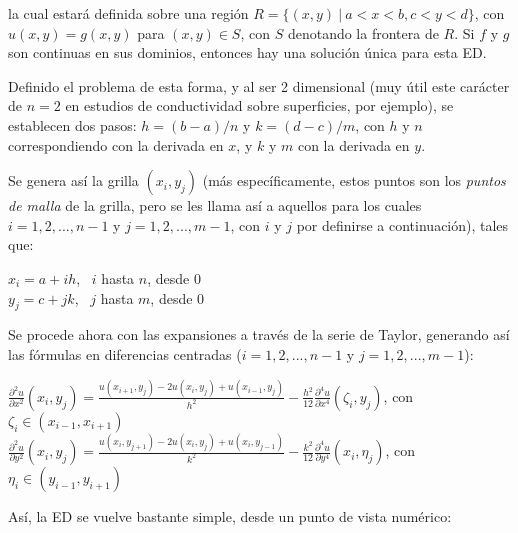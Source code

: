 \documentclass[letter]{article}
\begin{document}
la cual estará definida sobre una región $\displaystyle R=\{(x,y) \ | \ a<x<b, c<y<d\}$, con $\displaystyle u(x,y)=g(x,y)$ para $\displaystyle (x,y)\in S$, con $\displaystyle S$ denotando la frontera de $\displaystyle R$. Si $\displaystyle f$ y $\displaystyle g$ son continuas en sus dominios, entonces hay una solución única para esta ED.

Definido el problema de esta forma, y al ser 2 dimensional (muy útil este carácter de $\displaystyle n=2$ en estudios de conductividad sobre superficies, por ejemplo), se establecen dos pasos: $\displaystyle h=(b-a)/n$ y $\displaystyle k=(d-c)/m$, con $\displaystyle h$ y $\displaystyle n$ correspondiendo con la derivada en $\displaystyle x$, y $\displaystyle k$ y $\displaystyle m$ con la derivada en $\displaystyle y$.

Se genera así la grilla $\displaystyle (x_{i},y_{j})$ (más específicamente, estos puntos son los \textit{puntos de malla} de la grilla, pero se les llama así a aquellos para los cuales $\displaystyle i=1,2,...,n-1$ y $\displaystyle j=1,2,...,m-1$, con $\displaystyle i$ y $\displaystyle j$ por definirse a continuación), tales que:

\begin{center}
$\displaystyle x_{i}=a+ih$, \ $\displaystyle i$ hasta $\displaystyle n$, desde 0\\
$\displaystyle y_{j}=c+jk$, \ $\displaystyle j$ hasta $\displaystyle m$, desde 0
\end{center}

Se procede ahora con las expansiones a través de la serie de Taylor, generando así las fórmulas en diferencias centradas ($\displaystyle i=1,2,...,n-1$ y $\displaystyle j=1,2,...,m-1$):

\begin{center}
$\displaystyle \frac{\partial^{2}u}{\partial x^{2}}(x_{i},y_{j})=\frac{u(x_{i+1},y_{j})-2u(x_{i},y_{j})+u(x_{i-1},y_{j})}{h^{2}}-\frac{h^{2}}{12}\frac{\partial^{4}u}{\partial x^{4}}(\zeta _{i},y_{j})$, con $\displaystyle \zeta_{i}\in(x_{i-1},x_{i+1})$\\
$\displaystyle \frac{\partial^{2}u}{\partial y^{2}}(x_{i},y_{j})=\frac{u(x_{i},y_{j+1})-2u(x_{i},y_{j})+u(x_{i},y_{j-1})}{k^{2}}-\frac{k^{2}}{12}\frac{\partial^{4}u}{\partial y^{4}}(x_{i},\eta_{j})$, con $\displaystyle \eta_{i}\in(y_{i-1},y_{i+1})$
\end{center}

Así, la ED se vuelve bastante simple, desde un punto de vista numérico:
\end{document}
